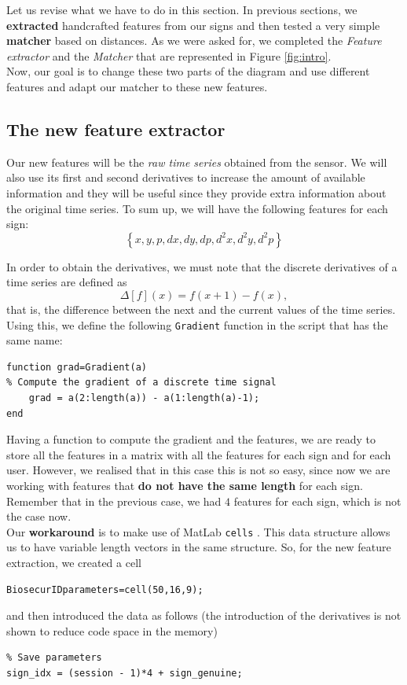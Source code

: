 \documentclass[a4paper]{article}
\def\inline{\lstinline[basicstyle=\ttfamily,keywordstyle={}]}
\begin{document}
{Let us revise what we have to do in this section. In previous sections, we \textbf{extracted} handcrafted features from our signs and then tested a very simple \textbf{matcher} based on distances. As we were asked for, we completed the \emph{Feature extractor} and the \emph{Matcher} that are represented in Figure \ref{fig:intro}.\\

Now, our goal is to change these two parts of the diagram and use different features and adapt our matcher to these new features.

\subsection{The new feature extractor}

Our new features will be the \emph{raw time series} obtained from the sensor. We will also use its first and second derivatives to increase the amount of available information and they will be useful since they provide extra information about the original time series. To sum up, we will have the following features for each sign:
\[
\left\{x, y, p, dx, dy, dp, d^2x, d^2y, d^2p\right\}  
\]

In order to obtain the derivatives, we must note that the discrete derivatives of a time series are defined as
\[
 \Delta [f](x)=f(x+1)-f(x),
\]
that is, the difference between the next and the current values of the time series. Using this, we define the following \inline{Gradient} function in the script that has the same name:
\begin{verbatim}
function grad=Gradient(a)
% Compute the gradient of a discrete time signal
    grad = a(2:length(a)) - a(1:length(a)-1);
end
\end{verbatim}

Having a function to compute the gradient and the features, we are ready to store all the features in a matrix with all the features for each sign and for each user. However, we realised that in this case this is not so easy, since now we are working with features that \textbf{do not have the same length} for each sign. Remember that in the previous case, we had \(4\) features for each sign, which is not the case now.\\

Our \textbf{workaround} is to make use of MatLab \inline{cells} \footnotemark. This data structure allows us to have variable length vectors in the same structure. So, for the new feature extraction, we created a cell
\begin{verbatim}
BiosecurIDparameters=cell(50,16,9);
\end{verbatim}
  and then introduced the data as follows (the introduction of the derivatives is not shown to reduce code space in the memory)
\begin{verbatim}
% Save parameters
sign_idx = (session - 1)*4 + sign_genuine;


\end{verbatim}}
\end{document}
